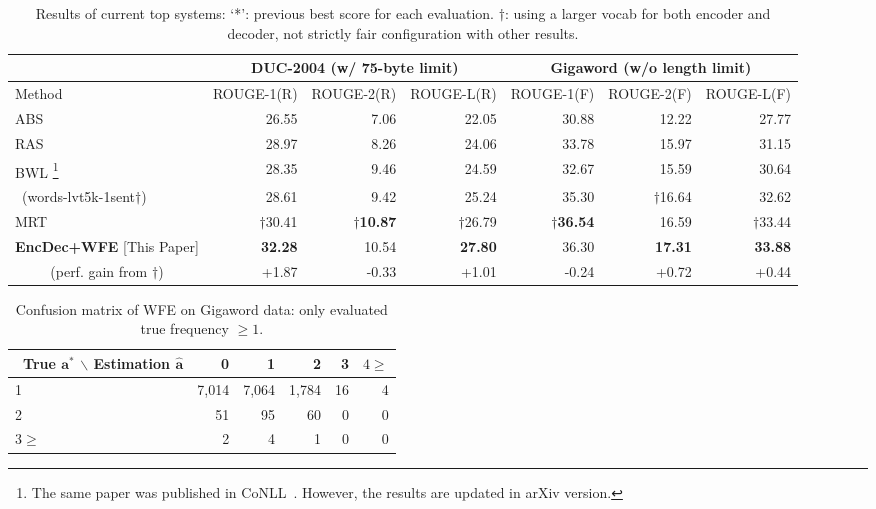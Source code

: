 \documentclass[11pt]{article}
\begin{document}
\begin{table*}[t]
 \small
 \centering
 \tabcolsep=2pt
 \begin{tabular}{l | r | r | r || r | r| r}
  \hline
   \             & \multicolumn{3}{c||}{DUC-2004 (w/ 75-byte limit)}
                  & \multicolumn{3}{c}{Gigaword (w/o length limit)}\\
  \hline
  Method & ROUGE-1(R) & ROUGE-2(R) & ROUGE-L(R) & ROUGE-1(F) & ROUGE-2(F) & ROUGE-L(F)\\
  \hline
  ABS \cite{rush-chopra-weston:2015:EMNLP}
                       & 26.55  & 7.06  & 22.05 & 30.88 & 12.22 & 27.77\\
  \hline
  RAS \cite{chopra-auli-rush:2016:N16-1}&
      28.97  & 8.26  & 24.06 & 33.78  & 15.97 & 31.15\\
  \hline
  BWL \cite{DBLP:journals/corr/NallapatiXZ16}\footnote{The same paper was published in CoNLL~\cite{nallapati-EtAl:2016:CoNLL}. However, the results are updated in arXiv version.}&
      28.35  & 9.46  & 24.59 & 32.67  & 15.59 & 30.64\\
  \,\,\,(words-lvt5k-1sent$\dagger$)  &
      28.61  & 9.42  &25.24  &35.30   &$\dagger$16.64 & 32.62 \\
  \hline
MRT \cite{DBLP:journals/corr/AyanaSLS16}&
      $\dagger$30.41  & $\dagger$\bf 10.87  & $\dagger$26.79 & $\dagger$\bf 36.54  & 16.59 & $\dagger$33.44\\
  \hline
{\bf EncDec+WFE} [This Paper] &\bf  32.28  & 10.54  &\bf 27.80
                                   & 36.30 &\bf 17.31  &\bf 33.88 \\
  \hline
   \hline
   \multicolumn{1}{c|}{ (perf. gain from $\dagger$)}
                              &      +1.87 &  -0.33 &   +1.01           &   -0.24 &  +0.72 &   +0.44 \\
   \hline
 \end{tabular}
 \caption{Results of current top systems: `*': previous best score for each evaluation. $\dagger$: using a larger vocab for both encoder and decoder, not strictly fair configuration with other results.}
 \label{table:topsystem}
\end{table*}
\begin{table}[t]
 \small
 \centering
 \tabcolsep=2pt
 \begin{tabular}{ l || r | r |r |r|r   }
  \hline 
  \  True $\bm{a}^*$ $\backslash$ Estimation $\hat{\bm{a}}$  &   0  & 1 &   2  & 3 & $4\geq$  \\
  \hline 
  1              &  7,014  & 7,064     &  1,784  & 16  & 4  \\
  \hline 
  2              &  51     &    95     &   60    & 0 & 0  \\
  \hline 
  $3 \geq$       &   2    &  4      &   1     & 0 & 0  \\
  \hline 
 \end{tabular}
 \caption{Confusion matrix of WFE on Gigaword data: only evaluated true frequency $\geq 1$.}
 \label{table:result_wordset}
\end{table}
\end{document}
